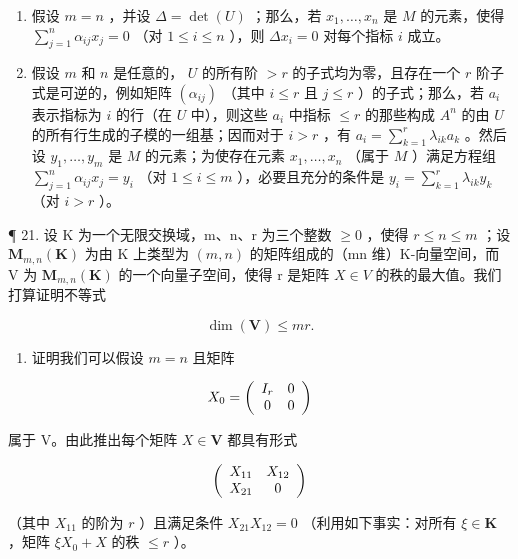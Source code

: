 \begin{enumerate}
\def\labelenumi{(\alph{enumi})}
\item
  假设 \(m = n\) ，并设 \(\Delta = \det(U)\) ；那么，若 \(x_1, \ldots, x_n\) 是 \(M\) 的元素，使得 \(\sum_{j=1}^{n} \alpha_{ij} x_j = 0\) （对 \(1 \leqslant i \leqslant n\) ），则 \(\Delta x_i = 0\) 对每个指标 \(i\) 成立。
\item
  假设 \(m\) 和 \(n\) 是任意的， \(U\) 的所有阶 \(> r\) 的子式均为零，且存在一个 \(r\) 阶子式是可逆的，例如矩阵 \((\alpha_{ij})\) （其中 \(i \leqslant r\) 且 \(j \leqslant r\) ）的子式；那么，若 \(a_i\) 表示指标为 \(i\) 的行（在 \(U\) 中），则这些 \(a_i\) 中指标 \(\leqslant r\) 的那些构成 \(A^n\) 的由 \(U\) 的所有行生成的子模的一组基；因而对于 \(i > r\) ，有 \(a_i = \sum_{k=1}^{r} \lambda_{ik} a_k\) 。然后设 \(y_1, \ldots, y_m\) 是 \(M\) 的元素；为使存在元素 \(x_1, \ldots, x_n\) （属于 \(M\) ）满足方程组 \(\sum_{j=1}^{n} \alpha_{ij} x_j = y_i\) （对 \(1 \leqslant i \leqslant m\) ），必要且充分的条件是 \(y_i = \sum_{k=1}^{r} \lambda_{ik} y_k\) （对 \(i > r\) ）。
\end{enumerate}

¶ 21. 设 K 为一个无限交换域，m、n、r 为三个整数 \(\geqslant0\) ，使得 \(r\leqslant n\leqslant m\) ；设 \(\mathbf{M}_{m,n}(\mathbf{K})\) 为由 K 上类型为 \((m,n)\) 的矩阵组成的（mn 维）K-向量空间，而 V 为 \(\mathbf{M}_{m,n}(\mathbf{K})\) 的一个向量子空间，使得 r 是矩阵 \(X\in V\) 的秩的最大值。我们打算证明不等式

\[
\dim (\mathbf {V}) \leqslant m r.\tag{*}
\]

\begin{enumerate}
\def\labelenumi{(\alph{enumi})}
\tightlist
\item
  证明我们可以假设 \(m = n\) 且矩阵
\end{enumerate}

\[
X _ {0} = \left( \begin{array}{c c} I _ {r} & 0 \\ 0 & 0 \end{array} \right)
\]

属于 V。由此推出每个矩阵 \(X \in \mathbf{V}\) 都具有形式

\[
\left( \begin{array}{c c} X _ {1 1} & X _ {1 2} \\ X _ {2 1} & 0 \end{array} \right)
\]

（其中 \(X_{11}\) 的阶为 \(r\) ）且满足条件 \(X_{21}X_{12} = 0\) （利用如下事实：对所有 \(\xi \in \mathbf{K}\) ，矩阵 \(\xi X_0 + X\) 的秩 \(\leqslant r\) ）。

